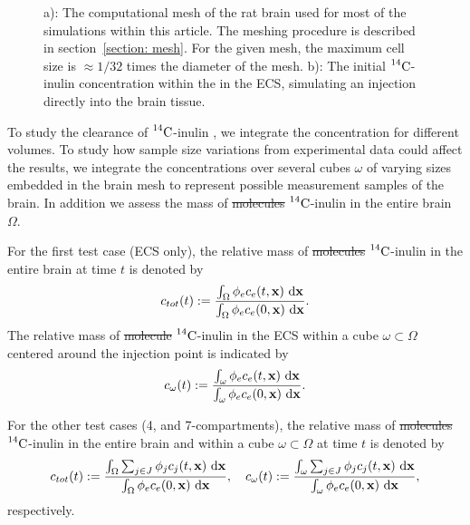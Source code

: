 \documentclass[10pt]{article}
\newcommand{\1}{^{(1)}}
\newcommand{\2}{^{(2)}}
\newcommand*{\dd}{\mathop{\kern0pt\mathrm{d}}\!{}}
\newcommand {\x}   {\mathbf{x}}
\newcommand{\Cinulin}{$\prescript{14}{}{\text{C}}$-inulin }
\providecommand{\DIFdeltex}[1]{{\protect\color{red}\sout{#1}}}                      %
\providecommand{\DIFaddbegin}{} %
\providecommand{\DIFaddend}{} %
\providecommand{\DIFdelbegin}{} %
\providecommand{\DIFdelend}{} %
\providecommand{\DIFdel}[1]{\texorpdfstring{\DIFdeltex{#1}}{}} %
\newcommand{\DIFscaledelfig}{0.5}
\newlength{\DIFdelgraphicswidth} %
\newlength{\DIFdelgraphicsheight} %
\newcommand{\DIFaddincludegraphics}[2][]{{\color{blue}\fbox{\DIFOincludegraphics[#1]{#2}}}} %
\newcommand{\DIFdelincludegraphics}[2][]{%
\sbox{\DIFdelgraphicsbox}{\DIFOincludegraphics[#1]{#2}}%
\settoboxwidth{\DIFdelgraphicswidth}{\DIFdelgraphicsbox} %
\settoboxtotalheight{\DIFdelgraphicsheight}{\DIFdelgraphicsbox} %
\scalebox{\DIFscaledelfig}{%
\parbox[b]{\DIFdelgraphicswidth}{\usebox{\DIFdelgraphicsbox}\\[-\baselineskip] \rule{\DIFdelgraphicswidth}{0em}}\llap{\resizebox{\DIFdelgraphicswidth}{\DIFdelgraphicsheight}{%
\setlength{\unitlength}{\DIFdelgraphicswidth}%
\begin{picture}(1,1)%
\thicklines\linethickness{2pt} %
{\color[rgb]{1,0,0}\put(0,0){\framebox(1,1){}}}%
{\color[rgb]{1,0,0}\put(0,0){\line( 1,1){1}}}%
{\color[rgb]{1,0,0}\put(0,1){\line(1,-1){1}}}%
\end{picture}%
}\hspace*{3pt}}} %
} %
\DeclareRobustCommand{\DIFaddbegin}{\DIFOaddbegin \let\includegraphics\DIFaddincludegraphics} %
\DeclareRobustCommand{\DIFaddend}{\DIFOaddend \let\includegraphics\DIFOincludegraphics} %
\DeclareRobustCommand{\DIFdelbegin}{\DIFOdelbegin \let\includegraphics\DIFdelincludegraphics} %
\DeclareRobustCommand{\DIFdelend}{\DIFOaddend \let\includegraphics\DIFOincludegraphics} %
\begin{document}
\begin{figure}[htb]
    \centering
    \hfill
    \caption{a): The computational mesh of the rat brain used for most of the simulations within this article. The meshing procedure is described in section~\ref{section: mesh}. For the given mesh, the maximum cell size is $\approx 1/32$ times the diameter of the mesh. b): The initial \Cinulin concentration within the in the ECS, simulating an injection directly into the brain tissue.}
    \label{fig:mesh-illustration}
\end{figure}

To study the clearance of \Cinulin, we integrate the concentration for different volumes. To study how sample size variations from experimental data could affect the results, we integrate the concentrations over several cubes $\omega$ of varying sizes embedded in the brain mesh to represent possible measurement samples of the brain. In addition we assess the mass of \DIFdelbegin \DIFdel{molecules }\DIFdelend \DIFaddbegin \Cinulin \DIFaddend in the entire brain $\Omega$. 

For the first test case (ECS only), the relative mass of \DIFdelbegin \DIFdel{molecules }\DIFdelend \DIFaddbegin \Cinulin \DIFaddend in the entire brain at time $t$ is denoted by 
\[
c_{tot}(t) := \frac{\int_\Omega \phi_e c_e(t,\x) \, \dd \x }{ \int_\Omega \phi_e c_e(0,\x) \, \dd \x}.
\]
The relative mass of \DIFdelbegin \DIFdel{molecule }\DIFdelend \DIFaddbegin \Cinulin \DIFaddend in the ECS within a cube $\omega \subset \Omega$ centered around the injection point is indicated by 
\[
c_{\omega}(t) :=  \frac{\int_{\omega}  \phi_e c_e(t,\x) \, \dd \x }{\int_\omega  \phi_e c_e(0,\x) \, \dd \x}.  
\]

For the other test cases (4, and 7-compartments), the relative mass of \DIFdelbegin \DIFdel{molecules }\DIFdelend \DIFaddbegin \Cinulin \DIFaddend in the entire brain and within a cube $\omega \subset \Omega$ at time $t$ is denoted by
\[
c_{tot}(t) := \frac{\int_\Omega \sum_{j\in J}  \phi_j c_j(t,\x) \, \dd \x }{ \int_\Omega \phi_e c_e(0,\x) \, \dd \x}, \quad c_{\omega}(t) := \frac{\int_{\omega} \sum_{j\in J} \phi_j c_j(t,\x) \, \dd \x }{ \int_\omega \phi_e c_e(0,\x) \, \dd \x},
\]
respectively. 
\end{document}
